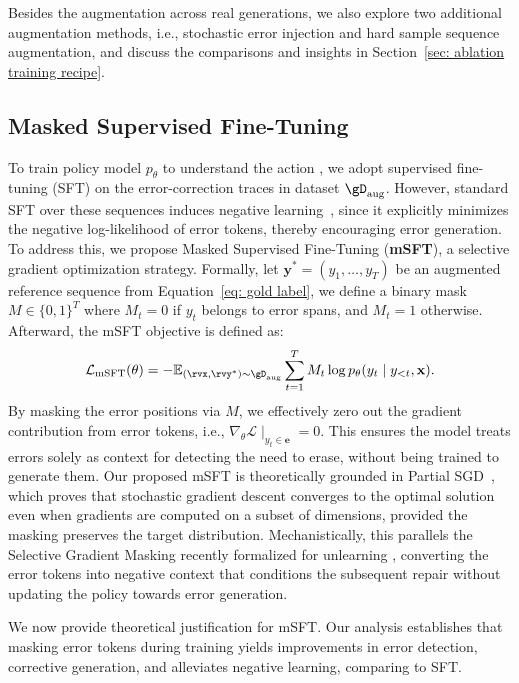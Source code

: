 Besides the augmentation across real generations, we also explore two additional augmentation methods, i.e., stochastic error injection and hard sample sequence augmentation, and discuss the comparisons and insights in Section~\ref{sec: ablation training recipe}.

\subsection{Masked Supervised Fine-Tuning}
To train policy model $p_\theta$ to understand the action \bk, we adopt supervised fine-tuning (SFT) on the error-correction traces in dataset $\gD_\text{aug}$.
However, standard SFT over these sequences induces {negative learning}~\cite{kumar2024training},
since it explicitly minimizes the negative log-likelihood of error tokens, thereby encouraging error generation.
To address this, we propose {Masked Supervised Fine-Tuning} (\textbf{mSFT}), a selective gradient optimization strategy. 
Formally, let $\mathbf{y}^* = (y_1, \ldots, y_T)$ be an augmented reference sequence from Equation~\ref{eq: gold label}, we define a binary mask $M \in \{0, 1\}^T$ where $M_t = 0$ if $y_t$ belongs to error spans, and $M_t = 1$ otherwise.
Afterward, the mSFT objective is defined as:
\begin{align}\label{eq:masked_sft}
    \mathcal{L}_{\text{mSFT}}(\theta) = -\mathbb{E}_{(\rvx, \rvy^*)\sim \gD_\text{aug}}\sum_{t=1}^{T} M_t \log p_\theta(y_t \mid y_{<t}, \mathbf{x}).
\end{align}
By masking the error positions via $M$, we effectively zero out the gradient contribution from error tokens, i.e., $\nabla_\theta \mathcal{L} \mid_{y_t \in \mathbf{e}} = 0$. 
This ensures the model treats errors solely as context for detecting the need to erase, without being trained to generate them.
Our proposed mSFT is theoretically grounded in Partial SGD~\citep{mohtashami2022masked}, which proves that stochastic gradient descent converges to the optimal solution even when gradients are computed on a subset of dimensions, provided the masking preserves the target distribution.
Mechanistically, this parallels the {Selective Gradient Masking} recently formalized for unlearning \citep{shilov2025beyond}, converting the error tokens into negative context \citep{liu2023chain} that conditions the subsequent repair without updating the policy towards error generation.

We now provide theoretical justification for mSFT. 
Our analysis establishes that masking error tokens during training yields improvements in error detection, corrective generation, and alleviates negative learning, comparing to SFT.

